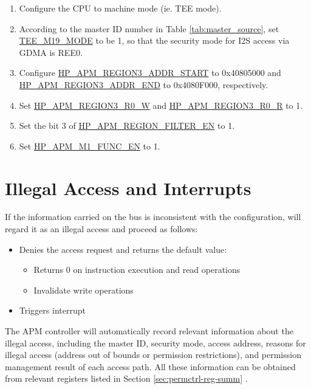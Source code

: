 \documentclass[main\_\_EN.tex]{subfiles}
\begin{document}
\begin{enumerate}

    \item Configure the CPU to machine mode (ie. TEE mode).

    \item According to the master ID number in Table \ref{tab:master_source}, set \hyperref[fielddesc:TEEM0MODE]{TEE\_M19\_MODE} to be 1, so that the security mode for I2S access via GDMA is REE0.

    \item Configure \hyperref[regdesc:HPAPMREGION0ADDRSTARTREG]{HP\_APM\_REGION3\_ADDR\_START} to 0x40805000 and \hyperref[regdesc:HPAPMREGION0ADDRSTARTREG]{HP\_APM\_REGION3\_ADDR\_END} to 0x4080F000, respectively.

    \item Set \hyperref[fielddesc:HPAPMREGION0R0W]{HP\_APM\_REGION3\_R0\_W} and  \hyperref[fielddesc:HPAPMREGION0R0R]{HP\_APM\_REGION3\_R0\_R} to 1.

    \item Set the bit 3 of \hyperref[fielddesc:HPAPMREGIONFILTEREN]{HP\_APM\_REGION\_FILTER\_EN} to 1.

    \item Set \hyperref[fielddesc:HPAPMM1FUNCEN]{HP\_APM\_M1\_FUNC\_EN} to 1.

\end{enumerate}

\section{Illegal Access and Interrupts}

If the information carried on the bus is inconsistent with the configuration, \chipname{} will regard it as an illegal access and proceed as follows:

\begin{itemize}
    \item Denies the access request and returns the default value:
    \begin{itemize}
        \item Returns 0 on instruction execution and read operations
        \item Invalidate write operations
    \end{itemize}
    \item Triggers interrupt
\end{itemize}

The APM controller will automatically record relevant information about the illegal access, including the master ID, security mode, access address, reasons for illegal access (address out of bounds or permission restrictions), and permission management result of each access path. All these information can be obtained from relevant registers listed in Section \ref{sec:permctrl-reg-summ} \textit{}.
\end{document}
